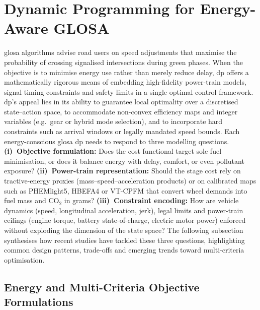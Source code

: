 \section{Dynamic Programming for Energy-Aware GLOSA}
\label{sec:eco_glosa}

\ac{glosa} algorithms advise road users on speed adjustments that maximise the probability of crossing signalised intersections during green phases.  When the objective is to minimise energy use rather than merely reduce delay, \ac{dp} offers a mathematically rigorous means of embedding high-fidelity power-train models, signal timing constraints and safety limits in a single optimal-control framework. \ac{dp}’s appeal lies in its ability to guarantee local optimality over a discretised state–action space, to accommodate non-convex efficiency maps and integer variables (e.g.\ gear or hybrid mode selection), and to incorporate hard constraints such as arrival windows or legally mandated speed bounds.
\mynewline
Each energy-conscious \ac{glosa} \ac{dp} needs to respond to three modelling questions. \textbf{(i)~Objective formulation:} Does the cost functional target sole fuel minimisation, or does it balance energy with delay, comfort, or even pollutant exposure? \textbf{(ii)~Power-train representation:} Should the stage cost rely on tractive-energy proxies (mass--speed--acceleration products) or on calibrated maps such as PHEMlight5, HBEFA4 or VT-CPFM that convert wheel demands into fuel mass and CO$_2$ in grams? \textbf{(iii)~Constraint encoding:} How are vehicle dynamics (speed, longitudinal acceleration, jerk), legal limits and power-train ceilings (engine torque, battery state-of-charge, electric motor power) enforced without exploding the dimension of the state space? The following subsection synthesises how recent studies have tackled these three questions, highlighting common design patterns, trade-offs and emerging trends toward multi-criteria optimisation.

\subsection{Energy and Multi-Criteria Objective Formulations}
\label{subsec:eco_dp_objectives}

